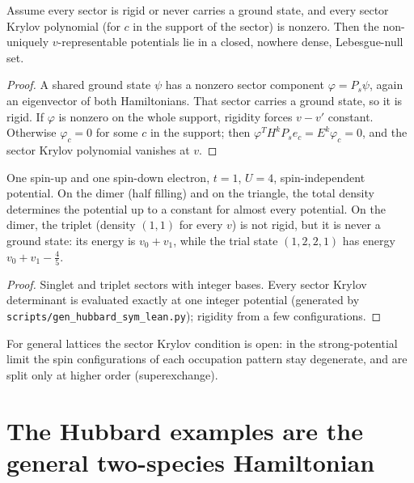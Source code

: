 \begin{theorem}
  \label{thm:generic_hk_sym}
  \leanok
  Assume every sector is rigid or never carries a ground state, and every sector Krylov polynomial (for
  $c$ in the support of the sector) is nonzero. Then the non-uniquely $v$-representable potentials lie in a
  closed, nowhere dense, Lebesgue-null set.
\end{theorem}
\begin{proof}
  \leanok
  A shared ground state $\psi$ has a nonzero sector component $\varphi=P_s\psi$, again an eigenvector of both
  Hamiltonians. That sector carries a ground state, so it is rigid. If $\varphi$ is nonzero on the whole
  support, rigidity forces $v-v'$ constant. Otherwise $\varphi_c=0$ for some $c$ in the support; then
  $\varphi^TH^kP_se_c=E^k\varphi_c=0$, and the sector Krylov polynomial vanishes at $v$.
\end{proof}

\begin{theorem}
  \label{thm:hubbard_certificates}
  \leanok
  One spin-up and one spin-down electron, $t=1$, $U=4$, spin-independent potential. On the dimer (half
  filling) and on the triangle, the total density determines the potential up to a constant for almost
  every potential. On the dimer, the triplet (density $(1,1)$ for every $v$) is not rigid, but it is never a
  ground state: its energy is $v_0+v_1$, while the trial state $(1,2,2,1)$ has energy $v_0+v_1-\tfrac45$.
\end{theorem}
\begin{proof}
  \leanok
  Singlet and triplet sectors with integer bases. Every sector Krylov determinant is evaluated exactly at
  one integer potential (generated by \texttt{scripts/gen\_hubbard\_sym\_lean.py}); rigidity from a few
  configurations.
\end{proof}

For general lattices the sector Krylov condition is open: in the strong-potential limit the spin
configurations of each occupation pattern stay degenerate, and are split only at higher order
(superexchange).

\section{The Hubbard examples are the general two-species Hamiltonian}

